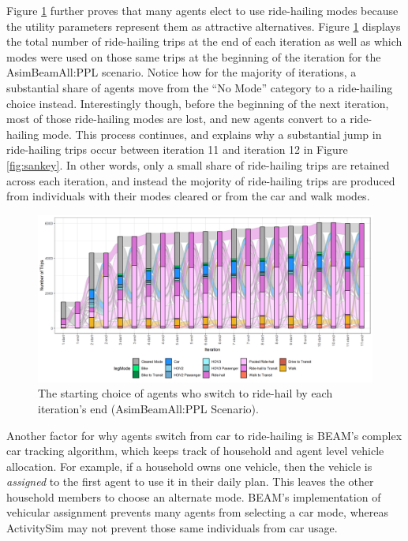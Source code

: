 \documentclass[fancy, masters]{byuthesis}
\begin{document}
Figure \ref{fig:sankey2} further proves that many agents elect to use ride-hailing modes because the utility parameters represent them as attractive alternatives. Figure \ref{fig:sankey2} displays the total number of ride-hailing trips at the end of each iteration as well as which modes were used on those same trips at the beginning of the iteration for the AsimBeamAll:PPL scenario. Notice how for the majority of iterations, a substantial share of agents move from the ``No Mode'' category to a ride-hailing choice instead. Interestingly though, before the beginning of the next iteration, most of those ride-hailing modes are lost, and new agents convert to a ride-hailing mode. This process continues, and explains why a substantial jump in ride-hailing trips occur between iteration 11 and iteration 12 in Figure \ref{fig:sankey}. In other words, only a small share of ride-hailing trips are retained across each iteration, and instead the mojority of ride-hailing trips are produced from individuals with their modes cleared or from the car and walk modes.

\begin{figure}

\centering
\includegraphics[width = 1.05\paperwidth]{planshifts_facet.png}
\caption{The starting choice of agents who switch to ride-hail by each iteration's end (AsimBeamAll:PPL Scenario).}
\label{fig:sankey2}

\end{figure}

Another factor for why agents switch from car to ride-hailing is BEAM's complex car tracking algorithm, which keeps track of household and agent level vehicle allocation. For example, if a household owns one vehicle, then the vehicle is \emph{assigned} to the first agent to use it in their daily plan. This leaves the other household members to choose an alternate mode. BEAM's implementation of vehicular assignment prevents many agents from selecting a car mode, whereas ActivitySim may not prevent those same individuals from car usage.
\end{document}
